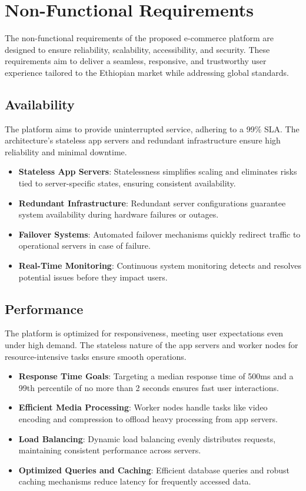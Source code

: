\documentclass[12pt]{report}
\begin{document}
\section{Non-Functional Requirements}

The non-functional requirements of the proposed e-commerce platform are designed to
ensure reliability, scalability, accessibility, and security. These requirements aim to deliver a
seamless, responsive, and trustworthy user experience tailored to the Ethiopian market while
addressing global standards.

\subsection{Availability}

The platform aims to provide uninterrupted service, adhering to a 99\% SLA. The
architecture's stateless app servers and redundant infrastructure ensure high reliability and
minimal downtime.

\begin{itemize}
	\item \textbf{Stateless App Servers}: Statelessness simplifies scaling and eliminates risks tied to
	      server-specific states, ensuring consistent availability.
	\item \textbf{Redundant Infrastructure}: Redundant server configurations guarantee system
	      availability during hardware failures or outages.
	\item \textbf{Failover Systems}: Automated failover mechanisms quickly redirect traffic to
	      operational servers in case of failure.
	\item \textbf{Real-Time Monitoring}: Continuous system monitoring detects and resolves potential
	      issues before they impact users.
\end{itemize}

\subsection{Performance}

The platform is optimized for responsiveness, meeting user expectations even under high
demand. The stateless nature of the app servers and worker nodes for resource-intensive tasks
ensure smooth operations.

\begin{itemize}
	\item \textbf{Response Time Goals}: Targeting a median response time of 500ms and a 99th
	      percentile of no more than 2 seconds ensures fast user interactions.
	\item \textbf{Efficient Media Processing}: Worker nodes handle tasks like video encoding and
	      compression to offload heavy processing from app servers.
	\item \textbf{Load Balancing}: Dynamic load balancing evenly distributes requests, maintaining
	      consistent performance across servers.
	\item \textbf{Optimized Queries and Caching}: Efficient database queries and robust caching
	      mechanisms reduce latency for frequently accessed data.
\end{itemize}
\end{document}

